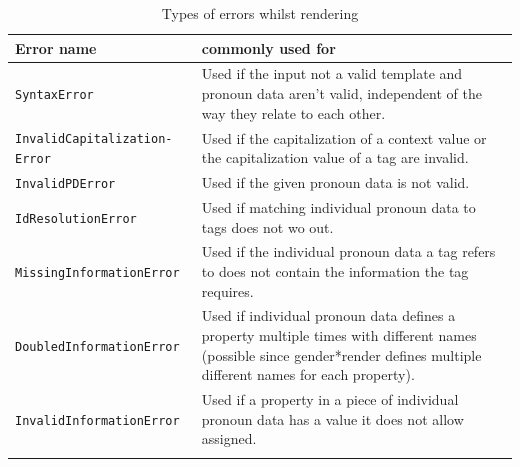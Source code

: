 \documentclass{article}
\newcommand{\GenderRender}{
    gender*render
}
\begin{document}
    \begin{flushleft}
        \begin{center}
            \begin{longtable}{|>{\raggedright\arraybackslash}p{13em} | >{\raggedright\arraybackslash}p{19em} |}
                 \hline
                 Error name & commonly used for \\
                 \hline\hline
                 \texttt{SyntaxError} & Used if the input not a valid template and pronoun data aren't valid, independent of the way they relate to each other. \\
                 \hline
                 \texttt{InvalidCapitalization- Error} & Used if the capitalization of a context value or the capitalization value of a tag are invalid. \\
                 \hline
                 \texttt{InvalidPDError} & Used if the given pronoun data is not valid. \\
                 \hline
                 \texttt{IdResolutionError} & Used if matching individual pronoun data to tags does not wo out.\\
                 \hline
                 \texttt{MissingInformationError} & Used if the individual pronoun data a tag refers to does not contain the information the tag requires.\\
                 \hline
                 \texttt{DoubledInformationError} & Used if individual pronoun data defines a property multiple times with different names (possible since \GenderRender defines multiple different names for each property). \\
                 \hline
                 \texttt{InvalidInformationError} & Used if a property in a piece of individual pronoun data has a value it does not allow assigned. \\
                 \hline
                \caption{Types of errors whilst rendering}
            \end{longtable}
        \end{center}
    \end{flushleft}
\end{document}

